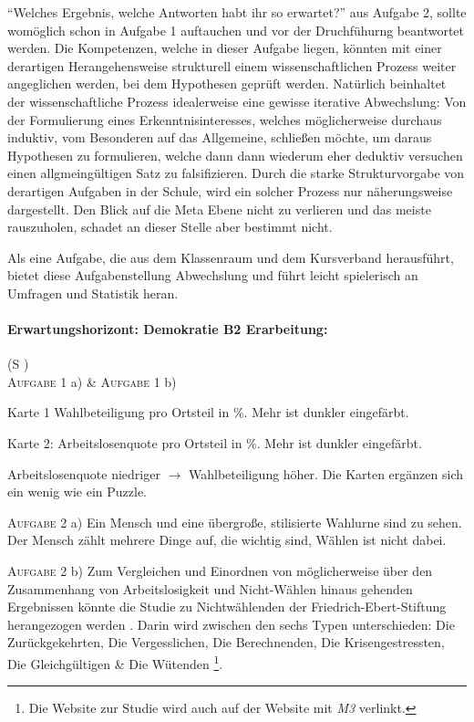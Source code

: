 \enquote{Welches Ergebnis, welche Antworten habt ihr so erwartet?} aus Aufgabe 2, sollte womöglich schon in Aufgabe 1 auftauchen und vor der Druchfühurng beantwortet werden. Die Kompetenzen, welche in dieser Aufgabe liegen, könnten mit einer derartigen Herangehensweise strukturell  einem wissenschaftlichen Prozess weiter angeglichen werden, bei dem Hypothesen geprüft werden. 
Natürlich beinhaltet der wissenschaftliche Prozess idealerweise eine gewisse iterative Abwechslung: Von der Formulierung eines Erkenntnisinteresses, welches möglicherweise durchaus induktiv, vom Besonderen auf das Allgemeine, schließen möchte, um daraus Hypothesen zu formulieren, welche dann dann wiederum eher deduktiv versuchen einen allgmeingültigen Satz zu falsifizieren. Durch die starke Strukturvorgabe von derartigen Aufgaben in der Schule, wird ein solcher Prozess nur näherungsweise dargestellt. Den Blick auf die Meta Ebene nicht zu verlieren und das meiste rauszuholen, schadet an dieser Stelle aber bestimmt nicht. 

Als eine Aufgabe, die aus dem Klassenraum und dem Kursverband herausführt, bietet diese Aufgabenstellung Abwechslung und führt leicht spielerisch an Umfragen und Statistik heran. 
\\



\paragraph{Erwartungshorizont: Demokratie B2 Erarbeitung:}  (\gls{S} \pageref{DEMOKRATIE-B2})
\\
\textsc{Aufgabe 1} a) \& \textsc{Aufgabe 1} b)
\begin{myitemize}
    \item Karte 1 Wahlbeteiligung pro Ortsteil in \%. Mehr ist dunkler eingefärbt.
    \item Karte 2: Arbeitslosenquote pro Ortsteil in \%. Mehr ist dunkler eingefärbt. 
    \item Arbeitslosenquote niedriger $\rightarrow$ Wahlbeteiligung höher. Die Karten ergänzen sich ein wenig wie ein Puzzle.
\end{myitemize}

\textsc{Aufgabe 2} a) \quad Ein Mensch und eine übergroße, stilisierte Wahlurne sind zu sehen. Der Mensch zählt mehrere Dinge auf, die wichtig sind, Wählen ist nicht dabei.

\textsc{Aufgabe 2} b) \quad Zum Vergleichen und Einordnen von möglicherweise über den Zusammenhang von Arbeitslosigkeit und Nicht-Wählen hinaus gehenden Ergebnissen könnte die Studie zu Nichtwählenden der Friedrich-Ebert-Stiftung herangezogen werden \autocite[]{Hagemeyer.2023}. Darin wird zwischen den sechs Typen unterschieden: Die Zurückgekehrten, Die Vergesslichen, Die Berechnenden, Die Krisengestressten, Die Gleichgültigen \& Die Wütenden \autocite[11-13]{Hagemeyer.2023}\footnote{Die Website zur Studie wird auch auf der Website mit \emph{M3} verlinkt.}. 
\\

